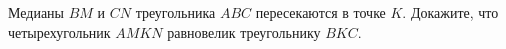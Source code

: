 \begin{ex}
	\begin{condition}
		Медианы \( BM  \) и \( CN  \) треугольника \( ABC  \) пересекаются в точке \( K \). Докажите, что четырехугольник \( AMKN  \) равновелик треугольнику \( BKC \).
	\end{condition}
\end{ex}